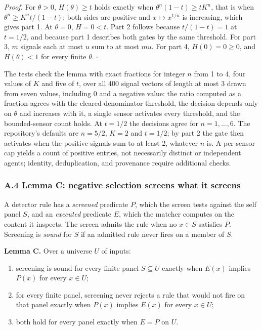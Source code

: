 \documentclass[
  11pt,
]{article}
\providecommand{\tightlist}{%
  \setlength{\itemsep}{0pt}\setlength{\parskip}{0pt}}
\begin{document}
\emph{Proof.} For \(\theta > 0\), \(H(\theta) \geq t\) holds exactly
when \(\theta^n (1 - t) \geq t K^n\), that is when
\(\theta^n \geq K^n t / (1 - t)\); both sides are positive and
\(x \mapsto x^{1/n}\) is increasing, which gives part 1. At
\(\theta = 0\), \(H = 0 < t\). Part 2 follows because
\(t / (1 - t) = 1\) at \(t = 1/2\), and because part 1 describes both
gates by the same threshold. For part 3, \(m\) signals each at most
\(u\) sum to at most \(mu\). For part 4, \(H(0) = 0 \geq 0\), and
\(H(\theta) < 1\) for every finite \(\theta\). \(\square\)

The tests check the lemma with exact fractions for integer \(n\) from 1
to 4, four values of \(K\) and five of \(t\), over all 400 signal
vectors of length at most 3 drawn from seven values, including 0 and a
negative value: the ratio computed as a fraction agrees with the
cleared-denominator threshold, the decision depends only on \(\theta\)
and increases with it, a single sensor activates every threshold, and
the bounded-sensor count holds. At \(t = 1/2\) the decisions agree for
\(n = 1,\allowbreak  \ldots,\allowbreak  6\). The repository's defaults
are \(n = 5/2\), \(K = 2\) and \(t = 1/2\); by part 2 the gate then
activates when the positive signals sum to at least 2, whatever \(n\)
is. A per-sensor cap yields a count of positive entries, not necessarily
distinct or independent agents; identity, deduplication, and provenance
require additional checks.

\subsubsection{A.4 Lemma C: negative selection screens what it
screens}\label{a.4-lemma-c-negative-selection-screens-what-it-screens}

A detector rule has a \emph{screened} predicate \(P\), which the screen
tests against the self panel \(S\), and an \emph{executed} predicate
\(E\), which the matcher computes on the content it inspects. The screen
admits the rule when no \(x \in S\) satisfies \(P\). Screening is
\emph{sound} for \(S\) if an admitted rule never fires on a member of
\(S\).

\textbf{Lemma C.} Over a universe \(U\) of inputs:

\begin{enumerate}
\def\labelenumi{\arabic{enumi}.}
\tightlist
\item
  screening is sound for every finite panel \(S \subseteq U\) exactly
  when \(E(x)\) implies \(P(x)\) for every \(x \in U\);
\item
  for every finite panel, screening never rejects a rule that would not
  fire on that panel exactly when \(P(x)\) implies \(E(x)\) for every
  \(x \in U\);
\item
  both hold for every panel exactly when \(E = P\) on \(U\).
\end{enumerate}
\end{document}

